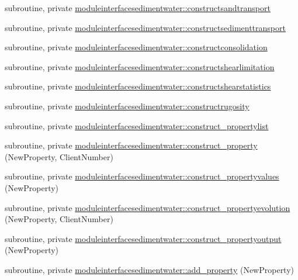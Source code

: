 \begin{DoxyCompactItemize}
\item 
subroutine, private \mbox{\hyperlink{namespacemoduleinterfacesedimentwater_a73bbb1dff0427c5f11a6ca3dce2ac6fb}{moduleinterfacesedimentwater\+::constructsandtransport}}
\item 
subroutine, private \mbox{\hyperlink{namespacemoduleinterfacesedimentwater_aa1f362c776321b794b1a5798a7a557d7}{moduleinterfacesedimentwater\+::constructsedimenttransport}}
\item 
subroutine, private \mbox{\hyperlink{namespacemoduleinterfacesedimentwater_af0c8cd28e080ee63fe3573266a390d33}{moduleinterfacesedimentwater\+::constructconsolidation}}
\item 
subroutine, private \mbox{\hyperlink{namespacemoduleinterfacesedimentwater_a2072a215e8db4306324a2b30c102ae15}{moduleinterfacesedimentwater\+::constructshearlimitation}}
\item 
subroutine, private \mbox{\hyperlink{namespacemoduleinterfacesedimentwater_a791c68b5d42b6f1a6b1fe8183420147b}{moduleinterfacesedimentwater\+::constructshearstatistics}}
\item 
subroutine, private \mbox{\hyperlink{namespacemoduleinterfacesedimentwater_ae92e82b3ef714cf8b3516fa5e25469d3}{moduleinterfacesedimentwater\+::constructrugosity}}
\item 
subroutine, private \mbox{\hyperlink{namespacemoduleinterfacesedimentwater_a1db436f609ed9890367a1345dba195c0}{moduleinterfacesedimentwater\+::construct\+\_\+propertylist}}
\item 
subroutine, private \mbox{\hyperlink{namespacemoduleinterfacesedimentwater_a7388cf4b98f85f5b8bc80f3e59724650}{moduleinterfacesedimentwater\+::construct\+\_\+property}} (New\+Property, Client\+Number)
\item 
subroutine, private \mbox{\hyperlink{namespacemoduleinterfacesedimentwater_a9e41247ffadd3cbbaf6315c7a890f885}{moduleinterfacesedimentwater\+::construct\+\_\+propertyvalues}} (New\+Property)
\item 
subroutine, private \mbox{\hyperlink{namespacemoduleinterfacesedimentwater_a6336ff1fc78b8fe728b00770c5b311b0}{moduleinterfacesedimentwater\+::construct\+\_\+propertyevolution}} (New\+Property, Client\+Number)
\item 
subroutine, private \mbox{\hyperlink{namespacemoduleinterfacesedimentwater_a63417d4ba89dc1cc869efface42ddc8a}{moduleinterfacesedimentwater\+::construct\+\_\+propertyoutput}} (New\+Property)
\item 
subroutine, private \mbox{\hyperlink{namespacemoduleinterfacesedimentwater_aa06e726d01ab265942552440a00f80f8}{moduleinterfacesedimentwater\+::add\+\_\+property}} (New\+Property)

\end{DoxyCompactItemize}
